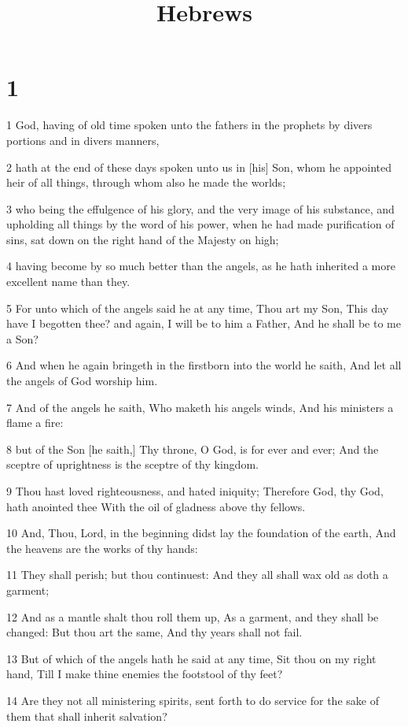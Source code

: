 

\title{Hebrews}

\chapter{1}

\par 1 God, having of old time spoken unto the fathers in the prophets by divers portions and in divers manners,
\par 2 hath at the end of these days spoken unto us in [his] Son, whom he appointed heir of all things, through whom also he made the worlds;
\par 3 who being the effulgence of his glory, and the very image of his substance, and upholding all things by the word of his power, when he had made purification of sins, sat down on the right hand of the Majesty on high;
\par 4 having become by so much better than the angels, as he hath inherited a more excellent name than they.
\par 5 For unto which of the angels said he at any time, Thou art my Son, This day have I begotten thee? and again, I will be to him a Father, And he shall be to me a Son?
\par 6 And when he again bringeth in the firstborn into the world he saith, And let all the angels of God worship him.
\par 7 And of the angels he saith, Who maketh his angels winds, And his ministers a flame a fire:
\par 8 but of the Son [he saith,] Thy throne, O God, is for ever and ever; And the sceptre of uprightness is the sceptre of thy kingdom.
\par 9 Thou hast loved righteousness, and hated iniquity; Therefore God, thy God, hath anointed thee With the oil of gladness above thy fellows.
\par 10 And, Thou, Lord, in the beginning didst lay the foundation of the earth, And the heavens are the works of thy hands:
\par 11 They shall perish; but thou continuest: And they all shall wax old as doth a garment;
\par 12 And as a mantle shalt thou roll them up, As a garment, and they shall be changed: But thou art the same, And thy years shall not fail.
\par 13 But of which of the angels hath he said at any time, Sit thou on my right hand, Till I make thine enemies the footstool of thy feet?
\par 14 Are they not all ministering spirits, sent forth to do service for the sake of them that shall inherit salvation?

